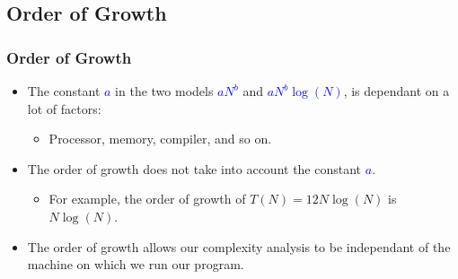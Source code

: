 \documentclass{beamer}
\begin{document}
\subsection{Order of Growth}

\begin{frame}%
\frametitle{Order of Growth}

\begin{itemize}
\item The constant \textcolor{blue}{$a$} in the two models \textcolor{blue}{$aN^b$} and \textcolor{blue}{$aN^b\log(N)$}, is dependant on a lot of factors:
\vspace{0.05cm}
\begin{itemize}
\item<1-> Processor, memory, compiler, and so on.
\end{itemize}

\vspace{0.25cm}

\item<2-> The order of growth does not take into account the constant \textcolor{blue}{$a$}.
\vspace{0.05cm}
\begin{itemize}
\item<2-> For example, the order of growth of $T(N) = 12N\log(N)$ is $N\log(N)$.
\end{itemize}

\vspace{0.25cm}

\item<3-> The order of growth allows our complexity analysis to be independant of the machine
on which we run our program.

\end{itemize}

\end{frame}
\end{document}
